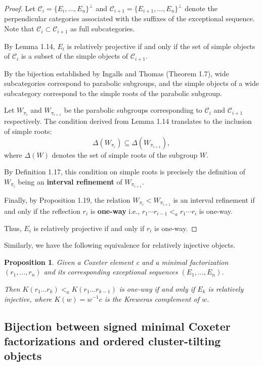 \documentclass[11pt]{amsart}
\newtheorem{prop}[thm]{Proposition}%
\begin{document}
\begin{proof}
Let $\mathcal{C}_{i} = \{E_i, \dots, E_n\}^\perp$ and $\mathcal{C}_{i+1} = \{E_{i+1}, \dots, E_n\}^\perp$ denote the perpendicular categories associated with the suffixes of the exceptional sequence. Note that $\mathcal{C}_{i} \subset \mathcal{C}_{i+1}$ as full subcategories.

By Lemma 1.14, $E_i$ is relatively projective if and only if the set of simple objects of $\mathcal{C}_{i}$ is a subset of the simple objects of $\mathcal{C}_{i+1}$. 

By the bijection established by Ingalls and Thomas \cite{ingalls2009noncrossing} (Theorem 1.7), wide subcategories correspond to parabolic subgroups, and the simple objects of a wide subcategory correspond to the simple roots of the parabolic subgroup. 

Let $W_{\pi_i}$ and $W_{\pi_{i+1}}$ be the parabolic subgroups corresponding to $\mathcal{C}_{i}$ and $\mathcal{C}_{i+1}$ respectively. The condition derived from Lemma 1.14 translates to the inclusion of simple roots:
\[
\Delta(W_{\pi_i}) \subseteq \Delta(W_{\pi_{i+1}}),
\]
where $\Delta(W)$ denotes the set of simple roots of the subgroup $W$.

By Definition 1.17, this condition on simple roots is precisely the definition of $W_{\pi_i}$ being an \textbf{interval refinement} of $W_{\pi_{i+1}}$.

Finally, by Proposition 1.19, the relation $W_{\pi_i} < W_{\pi_{i+1}}$ is an interval refinement if and only if the reflection $r_i$ is \textbf{one-way} i.e., $r_1\cdots r_{i-1}<_a r_1\cdots r_i$ is one-way.

Thus, $E_i$ is relatively projective if and only if $r_i$ is one-way.
\end{proof}

Similarly, we have the following equivalence for relatively injective objects.

\begin{prop}
    Given a Coxeter element c and a minimal factorization $(r_1,\dots,r_n)$ and its corresponding exceptional sequences $(E_1,\dots,E_n)$.

    Then $K(r_1\dots r_k) <_a K(r_1\dots r_{k-1})$ is one-way if and only if $E_k$ is relatively injective, where $K(w)=w^{-1}c$ is the Kreweras complement of $w$.
\end{prop}

\subsection{Bijection between signed minimal Coxeter 
factorizations and ordered cluster-tilting objects}
\end{document}
